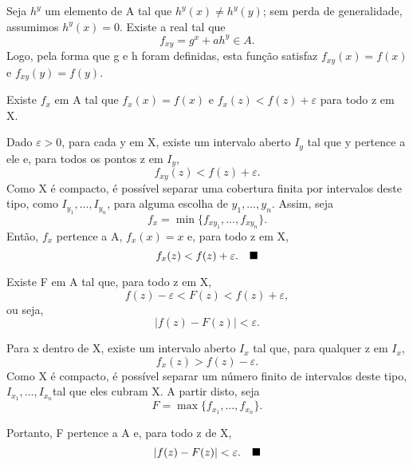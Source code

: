 \documentclass[../analysis_notes.tex]{subfiles}
\begin{document}
\begin{proof*}
\begin{proof*}
		Seja \(h^{y}\) um elemento de A tal que \(h^{y}(x)\neq h^{y}(y)\); sem perda de generalidade, assumimos \(h^{y}(x)=0\). Existe a real tal que
		\[
			f_{xy}=g^{x}+ah^{y}\in A.
		\]
		Logo, pela forma que g e h foram definidas, esta função satisfaz \(f_{xy}(x)=f(x)\) e \(f_{xy}(y)=f(y)\). \qedsymbol
	\end{proof*}
	\begin{lemma*}
		Existe \(f_{x}\) em A tal que \(f_{x}(x)=f(x)\) e \(f_{x}(z)<f(z)+\varepsilon \) para todo z em X.
	\end{lemma*}
	\begin{proof*}
		Dado \(\varepsilon >0\), para cada y em X, existe um intervalo aberto \(I_{y}\) tal que y pertence a ele e, para todos os pontos z em \(I_{y}\),
		\[
			f_{xy}(z)<f(z)+\varepsilon .
		\]
		Como X é compacto, é possível separar uma cobertura finita por intervalos deste tipo, como \(I_{y_{1}},\dotsc ,I_{y_{n}}\), para alguma escolha de \(y_{1},\dotsc ,y_{n}\). Assim, seja
		\[
			f_{x}=\min_{}\{f_{xy_{1}},\dotsc , f_{xy_{n}}\}.
		\]
		Então, \(f_{x}\) pertence a A, \(f_{x}(x)=x\) e, para todo z em X,
		\[
			f_{x}(z)<f(z)+\varepsilon .\quad \text{$\blacksquare$}
		\]
	\end{proof*}
	\begin{lemma*}
		Existe F em A tal que, para todo z em X,
		\[
			f(z)-\varepsilon < F(z)<f(z)+\varepsilon,
		\]
		ou seja,
		\[
			|f(z)-F(z)|<\varepsilon .
		\]
	\end{lemma*}
	\begin{proof*}
		Para x dentro de X, existe um intervalo aberto \(I_{x}\) tal que, para qualquer z em \(I_{x}\),
		\[
			f_{x}(z)>f(z)-\varepsilon .
		\]
		Como X é compacto, é possível separar um número finito de intervalos deste tipo, \(I_{x_{1}}, \dotsc ,I_{x_{n}}\)tal que eles cubram X. A partir disto, seja
		\[
			F=\max_{}\{f_{x_{1}}, \dotsc , f_{x_{n}}\}.
		\]

		Portanto, F pertence a A e, para todo z de X,
		\[
			|f(z)-F(z)|<\varepsilon .\quad \text{$\blacksquare$}
		\]
	\end{proof*}
\end{proof*}
\end{document}
